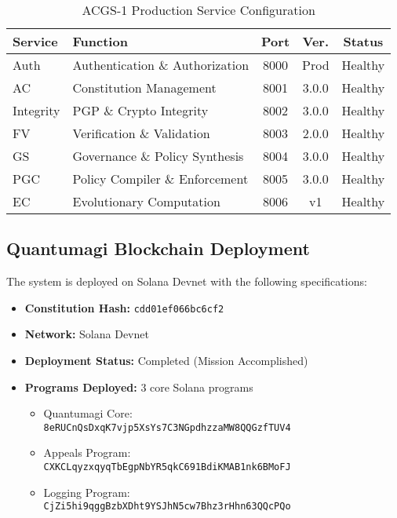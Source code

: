 \begin{table}[H]
\centering
\caption{ACGS-1 Production Service Configuration}\label{tab:acgs_services}
\footnotesize
\begin{tabular}{@{}lp{2.5cm}ccc@{}}
\toprule
\textbf{Service} & \textbf{Function} & \textbf{Port} & \textbf{Ver.} & \textbf{Status} \\
\midrule
Auth & Authentication \& Authorization & 8000 & Prod & Healthy \\
AC & Constitution Management & 8001 & 3.0.0 & Healthy \\
Integrity & PGP \& Crypto Integrity & 8002 & 3.0.0 & Healthy \\
FV & Verification \& Validation & 8003 & 2.0.0 & Healthy \\
GS & Governance \& Policy Synthesis & 8004 & 3.0.0 & Healthy \\
PGC & Policy Compiler \& Enforcement & 8005 & 3.0.0 & Healthy \\
EC & Evolutionary Computation & 8006 & v1 & Healthy \\
\bottomrule
\end{tabular}
\end{table}

\subsection{Quantumagi Blockchain Deployment}
The \quantumagi{} system is deployed on Solana Devnet with the following specifications:

\begin{itemize}[leftmargin=*,topsep=2pt,itemsep=2pt,parsep=0pt]
    \item \textbf{Constitution Hash:} \texttt{cdd01ef066bc6cf2}
    \item \textbf{Network:} Solana Devnet
    \item \textbf{Deployment Status:} Completed (Mission Accomplished)
    \item \textbf{Programs Deployed:} 3 core Solana programs
    \begin{itemize}
        \item Quantumagi Core: \\
        {\small\texttt{8eRUCnQsDxqK7vjp5XsYs7C3NGpdhzzaMW8QQGzfTUV4}}
        \item Appeals Program: \\
        {\small\texttt{CXKCLqyzxqyqTbEgpNbYR5qkC691BdiKMAB1nk6BMoFJ}}
        \item Logging Program: \\
        {\small\texttt{CjZi5hi9qggBzbXDht9YSJhN5cw7Bhz3rHhn63QQcPQo}}
    \end{itemize}
\end{itemize}

